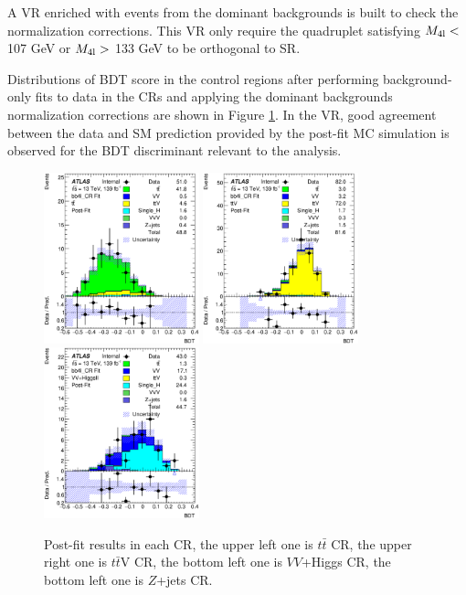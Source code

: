 A VR enriched with events from the dominant backgrounds is built to check the normalization corrections. This VR only require the quadruplet satisfying $M_{\rm 4l}<$ 107 GeV or $M_{\rm 4l}>$ 133 GeV to be orthogonal to SR.

Distributions of BDT score in the control regions after performing background-only fits to data in the CRs and applying the dominant backgrounds normalization corrections are shown in Figure \ref{Fig.CRs post-fit}. In the VR, good agreement between the data and SM prediction provided by the post-fit MC simulation is observed for the BDT discriminant relevant to the analysis.

\begin{figure}[H]
	\caption{Post-fit results in each CR, the upper left one is $t\bar{t}$ CR, the upper right one is $t\bar{t}$V CR, the bottom left one is $VV$+Higgs CR, the bottom left one is $Z$+jets CR.}
	\label{Fig.CRs post-fit}
	\centering
	\includegraphics[width=0.4\textwidth]{figures/4lbb/Plots/tt_CR_postFit.eps}
	\includegraphics[width=0.4\textwidth]{figures/4lbb/Plots/ttV_CR_postFit.eps}
	\includegraphics[width=0.4\textwidth]{figures/4lbb/Plots/VVHiggsII_CR_postFit.eps}

\end{figure}
